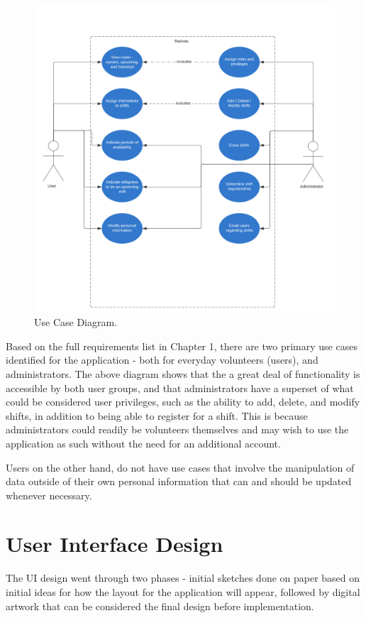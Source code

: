 \begin{figure}[!ht]
    \includegraphics[width=\textwidth]{Figures/usecase}
    \caption{Use Case Diagram.}
    \label{fig:usecase}
\end{figure}

Based on the full requirements list in Chapter 1, there are two primary use cases identified for the application - both for everyday volunteers (users), and administrators. The above diagram shows that the a great deal of functionality is accessible by both user groups, and that administrators have a superset of what could be considered user privileges, such as the ability to add, delete, and modify shifts, in addition to being able to register for a shift. This is because administrators could readily be volunteers themselves and may wish to use the application as such without the need for an additional account.

Users on the other hand, do not have use cases that involve the manipulation of data outside of their own personal information that can and should be updated whenever necessary.

\section{User Interface Design}
The UI design went through two phases - initial sketches done on paper based on initial ideas for how the layout for the application will appear, followed by digital artwork that can be considered the final design before implementation.

